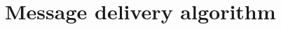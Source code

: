 \documentclass[times, 10pt]{article}
\begin{document}




\section{Message delivery algorithm}

\end{document}
